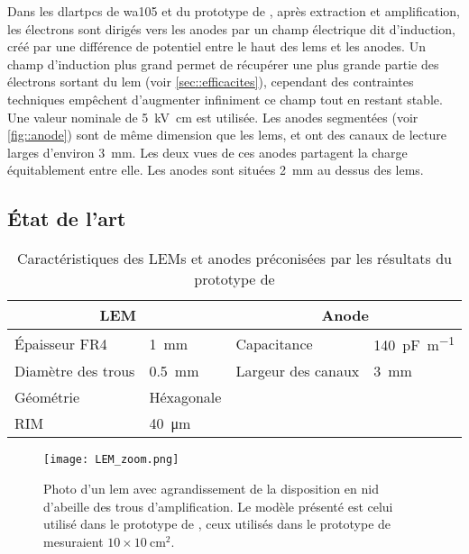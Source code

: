       Dans les \glspl{dlartpc} de \gls{wa105} et du prototype de \threeL{}, après extraction et amplification, les électrons sont dirigés vers les anodes par un champ électrique dit d'induction, créé par une différence de potentiel entre le haut des \glspl{lem} et les anodes. Un champ d'induction plus grand permet de récupérer une plus grande partie des électrons sortant du \gls{lem} (voir \autoref{sec::efficacites}), cependant des contraintes techniques empêchent d'augmenter infiniment ce champ tout en restant stable. Une valeur nominale de \SI{5}{\kilo\volt\centi\meter} est utilisée. Les anodes segmentées (voir \autoref{fig::anode}) sont de même dimension que les \glspl{lem}, et ont des canaux de lecture larges d'environ \SI{3}{\milli\meter}. Les deux vues de ces anodes partagent la charge équitablement entre elle. Les anodes sont situées \SI{2}{\milli\meter} au dessus des \glspl{lem}.

    \subsection{État de l'art}\label{sec::state_of_the_art}

      \begin{table}[]
        \centering
        \begin{tabular}{|ll||ll|}
          \hline
          \multicolumn{2}{|c||}{LEM} & \multicolumn{2}{c|}{Anode} \\ \hline \hline
          Épaisseur FR4 & \SI{1}{\milli\meter} & Capacitance & \SI{140}{\pico\farad\per\meter} \\
          Diamètre des trous & \SI{0.5}{\milli\meter} & Largeur des canaux & \SI{3}{\milli\meter} \\
          Géométrie & Héxagonale &  &  \\
          RIM & \SI{40}{\micro\meter} &  &  \\ \hline
        \end{tabular}
        \caption[Caractéristiques des LEMs et anodes utilisé dans le \threeL{}]{\label{tab::lem_anode}Caractéristiques des LEMs et anodes préconisées par les résultats du prototype de \threeL{}}
      \end{table}

      \begin{figure}[htbp]
        \centering
        \texttt{[image: LEM\_zoom.png]} 
        \caption[Photo d'un amplificateur d'électron]{Photo d'un \gls{lem} avec agrandissement de la disposition en nid d'abeille des trous d'amplification. Le modèle présenté est celui utilisé dans le prototype de \TOO{}, ceux utilisés dans le prototype de \threeL{} mesuraient $10\times\SI{10}{\centi\meter\squared}$.}
        \label{fig::lem}
      \end{figure}


